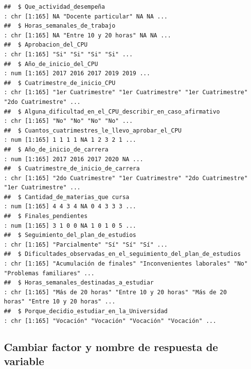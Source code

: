 \documentclass[
]{article}
\begin{document}
\begin{verbatim}
##  $ Que_actividad_desempeña                                                : chr [1:165] NA "Docente particular" NA NA ...
##  $ Horas_semanales_de_trabajo                                             : chr [1:165] NA "Entre 10 y 20 horas" NA NA ...
##  $ Aprobacion_del_CPU                                                     : chr [1:165] "Si" "Si" "Si" "Si" ...
##  $ Año_de_inicio_del_CPU                                                  : num [1:165] 2017 2016 2017 2019 2019 ...
##  $ Cuatrimestre_de_inicio_CPU                                             : chr [1:165] "1er Cuatrimestre" "1er Cuatrimestre" "1er Cuatrimestre" "2do Cuatrimestre" ...
##  $ Alguna_dificultad_en_el_CPU_describir_en_caso_afirmativo               : chr [1:165] "No" "No" "No" "No" ...
##  $ Cuantos_cuatrimestres_le_llevo_aprobar_el_CPU                          : num [1:165] 1 1 1 1 NA 1 2 3 2 1 ...
##  $ Año_de_inicio_de_carrera                                               : num [1:165] 2017 2016 2017 2020 NA ...
##  $ Cuatrimestre_de_inicio_de_carrera                                      : chr [1:165] "2do Cuatrimestre" "1er Cuatrimestre" "2do Cuatrimestre" "1er Cuatrimestre" ...
##  $ Cantidad_de_materias_que cursa                                         : num [1:165] 4 4 3 4 NA 0 4 3 3 3 ...
##  $ Finales_pendientes                                                     : num [1:165] 3 1 0 0 NA 1 0 1 0 5 ...
##  $ Seguimiento_del_plan_de_estudios                                       : chr [1:165] "Parcialmente" "Sí" "Sí" "Sí" ...
##  $ Dificultades_observadas_en_el_seguimiento_del_plan_de_estudios         : chr [1:165] "Acumulación de finales" "Inconvenientes laborales" "No" "Problemas familiares" ...
##  $ Horas_semanales_destinadas_a_estudiar                                  : chr [1:165] "Más de 20 horas" "Entre 10 y 20 horas" "Más de 20 horas" "Entre 10 y 20 horas" ...
##  $ Porque_decidio_estudiar_en_la_Universidad                              : chr [1:165] "Vocación" "Vocación" "Vocación" "Vocación" ...
\end{verbatim}

\hypertarget{cambiar-factor-y-nombre-de-respuesta-de-variable}{%
\subsection{Cambiar factor y nombre de respuesta de
variable}\label{cambiar-factor-y-nombre-de-respuesta-de-variable}}
\end{document}

